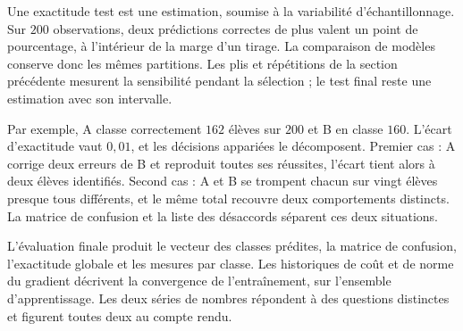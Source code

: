 \begin{vigilance}
Une exactitude test est une estimation, soumise à la variabilité
d'échantillonnage. Sur $200$ observations, deux prédictions correctes de plus
valent un point de pourcentage, à l'intérieur de la marge d'un tirage. La
comparaison de modèles conserve donc les mêmes partitions. Les plis et
répétitions de la section précédente mesurent la sensibilité pendant la
sélection ; le test final reste une estimation avec son intervalle.
\end{vigilance}

Par exemple, A classe correctement $162$ élèves sur $200$ et B en classe $160$.
L'écart d'exactitude vaut $0{,}01$, et les décisions appariées le décomposent.
Premier cas : A corrige deux erreurs de B et reproduit toutes ses réussites,
l'écart tient alors à deux élèves identifiés. Second cas : A et B se trompent
chacun sur vingt élèves presque tous différents, et le même total recouvre deux
comportements distincts. La matrice de confusion et la liste des désaccords
séparent ces deux situations.

\begin{resultat}
L'évaluation finale produit le vecteur des classes prédites, la matrice de
confusion, l'exactitude globale et les mesures par classe. Les historiques de
coût et de norme du gradient décrivent la convergence de l'entraînement, sur
l'ensemble d'apprentissage. Les deux séries de nombres répondent à des questions
distinctes et figurent toutes deux au compte rendu.
\end{resultat}
